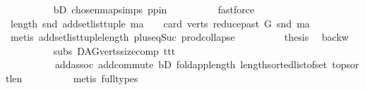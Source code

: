 \begin{isabellebody}
\ \ \ \ \ \ \ \ \isamarkupfalse%
\ bD\ chosen{\isacharunderscore}{\kern0pt}map{\isacharunderscore}{\kern0pt}simps{\isacharparenleft}{\kern0pt}{}{\isacharparenright}{\kern0pt}\ pp{\isacharunderscore}{\kern0pt}in\isanewline
\ \ \ \ \ \ \ \ \isamarkupfalse%
\ fastforce\ \ \isanewline
\ \ \ \ \ \ \isamarkupfalse%
\ \isamarkupfalse%
\ {\isachardoublequoteopen}length\ {\isacharparenleft}{\kern0pt}snd\ {\isacharparenleft}{\kern0pt}add{\isacharunderscore}{\kern0pt}set{\isacharunderscore}{\kern0pt}list{\isacharunderscore}{\kern0pt}tuple\ ma{\isacharparenright}{\kern0pt}{\isacharparenright}{\kern0pt}\ {\isacharequal}{\kern0pt}\ {}\ {\isacharplus}{\kern0pt}\ card\ {\isacharparenleft}{\kern0pt}verts\ {\isacharparenleft}{\kern0pt}reduce{\isacharunderscore}{\kern0pt}past\ G\ {\isacharparenleft}{\kern0pt}snd\ ma{\isacharparenright}{\kern0pt}{\isacharparenright}{\kern0pt}{\isacharparenright}{\kern0pt}{\isachardoublequoteclose}\isanewline
\ \ \ \ \ \ \ \ \isamarkupfalse%
\ {\isacharparenleft}{\kern0pt}metis\ add{\isacharunderscore}{\kern0pt}set{\isacharunderscore}{\kern0pt}list{\isacharunderscore}{\kern0pt}tuple{\isacharunderscore}{\kern0pt}length\ plus{\isacharunderscore}{\kern0pt}{}{\isacharunderscore}{\kern0pt}eq{\isacharunderscore}{\kern0pt}Suc\ prod{\isachardot}{\kern0pt}collapse{\isacharparenright}{\kern0pt}\isanewline
\ \ \ \ \ \ \isamarkupfalse%
\ \isamarkupfalse%
\ {\isacharquery}{\kern0pt}thesis\ \isamarkupfalse%
\ backw\isanewline
\ \ \ \ \ \ \ \ \isamarkupfalse%
\ subs{\isacharparenleft}{\kern0pt}{}{\isacharparenright}{\kern0pt}\ DAG{\isachardot}{\kern0pt}verts{\isacharunderscore}{\kern0pt}size{\isacharunderscore}{\kern0pt}comp\ ttt\isanewline
\ \ \ \ \ \ \ \ \ \ add{\isachardot}{\kern0pt}assoc\ add{\isachardot}{\kern0pt}commute\ bD\ fold{\isacharunderscore}{\kern0pt}app{\isacharunderscore}{\kern0pt}length\ length{\isacharunderscore}{\kern0pt}sorted{\isacharunderscore}{\kern0pt}list{\isacharunderscore}{\kern0pt}of{\isacharunderscore}{\kern0pt}set\ top{\isacharunderscore}{\kern0pt}sort{\isacharunderscore}{\kern0pt}len\isanewline
\ \ \ \ \ \ \ \ \isamarkupfalse%
\ {\isacharparenleft}{\kern0pt}metis\ {\isacharparenleft}{\kern0pt}full{\isacharunderscore}{\kern0pt}types{\isacharparenright}{\kern0pt}{\isacharparenright}{\kern0pt}\ \ \ \isanewline
\ \ \ \ \isamarkupfalse%
\isanewline
\ \ \isamarkupfalse%
\isanewline
{}\isamarkupfalse%

\end{isabellebody}
